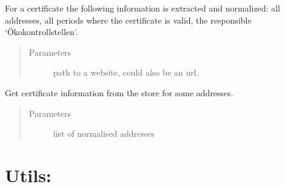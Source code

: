 \documentclass[letterpaper,10pt,english]{sphinxmanual}
\begin{document}
\begin{fulllineitems}
\begin{fulllineitems}
For a certificate the following information is extracted and
normalized: all addresses, all periods where the certificate
is valid, the responsible ‘Ökokontrollstellen’.
\begin{quote}\begin{description}
\item[{Parameters}] \leavevmode
{} \textendash{} path to a website, could also be an url.

\end{description}\end{quote}

\end{fulllineitems}


\begin{fulllineitems}
\label{\detokenize{api:bioc.BiocStore.get_certificate_for_addresses}}
Get certificate information from the store for some addresses.
\begin{quote}\begin{description}
\item[{Parameters}] \leavevmode
{} \textendash{} list of normalised addresses

\end{description}\end{quote}

\end{fulllineitems}


\end{fulllineitems}



\section{Utils:}
\label{\detokenize{api:module-my_exceptions}}\label{\detokenize{api:utils}}
\end{document}
